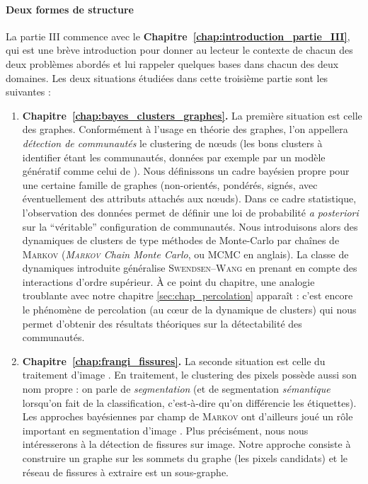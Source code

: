 \documentclass{these-ISSS} %
\begin{document}
\paragraph{Deux formes de structure}
La partie III commence avec le \textbf{Chapitre~\ref{chap:introduction_partie_III}}, qui est une brève introduction pour donner au lecteur le contexte de chacun des deux problèmes abordés et lui rappeler quelques bases dans chacun des deux domaines.
Les deux situations étudiées dans cette troisième partie sont les suivantes : %
\begin{enumerate}
    \item \textbf{Chapitre~\ref{chap:bayes_clusters_graphes}.} La première situation est celle des graphes. Conformément à l'usage en théorie des graphes, l'on appellera \emph{détection de communautés} le clustering de nœuds (les bons clusters à identifier étant les communautés, données par exemple par un modèle génératif comme celui de \SB{} \cite{SankararamanBaccelli2018}). 
    Nous définissons un cadre bayésien propre pour une certaine famille de graphes (non-orientés, pondérés, signés, avec éventuellement des attributs attachés aux nœuds). Dans ce cadre statistique, l'observation des données permet de définir une loi de probabilité \emph{a posteriori} sur la ``véritable'' configuration de communautés. Nous introduisons alors des dynamiques de clusters de type méthodes de Monte-Carlo par chaînes de \textsc{Markov} \cite{Robert1996MCMC} (\emph{\textsc{Markov} Chain Monte Carlo}, ou MCMC en anglais). La classe de dynamiques introduite généralise \textsc{Swendsen--Wang} \cite{SwendsenWang} en prenant en compte des interactions d'ordre supérieur. 
    À ce point du chapitre, une analogie troublante avec notre chapitre \ref{sec:chap_percolation} apparaît : c'est encore le phénomène de {percolation} (au cœur de la dynamique de clusters) qui nous permet d'obtenir des résultats théoriques sur la détectabilité des communautés.
    \item \textbf{Chapitre~\ref{chap:frangi_fissures}.} La seconde situation est celle du traitement d'image \cite{jain1989fundamentals, Zerubia1995, Gonzalez2018ImageProcessing}. En traitement, le clustering des pixels possède aussi son nom propre : on parle de \emph{segmentation} (et de segmentation \emph{sémantique} lorsqu'on fait de la classification, c'est-à-dire qu'on différencie les étiquettes). Les approches bayésiennes par champ de \textsc{Markov} ont d'ailleurs joué un rôle important en segmentation d'image \cite{KatoZerubia}. Plus précisément, nous nous intéresserons à la détection de fissures sur image. Notre approche consiste à construire un graphe sur les sommets du graphe (les pixels candidats) et le réseau de fissures à extraire est un sous-graphe. %

\end{enumerate}
\end{document}
